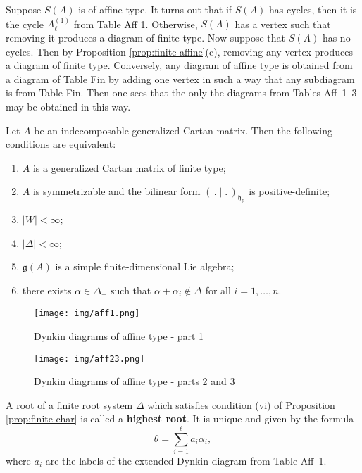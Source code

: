 \documentclass[12pt]{article}
\begin{document}
\begin{remark}
    Suppose $S(A)$ is of affine type. It turns out that if $S(A)$ has cycles, then it is the cycle $A_\ell^{(1)}$ from Table Aff 1. Otherwise, $S(A)$ has a vertex such that removing it produces a diagram of finite type. Now suppose that $S(A)$ has no cycles. Then by Proposition \ref{prop:finite-affine}(c), removing any vertex produces a diagram of finite type. Conversely, any diagram of affine type is obtained from a diagram of Table Fin by adding one vertex in such a way that any subdiagram is from Table Fin. Then one sees that the only the diagrams from Tables Aff~1--3 may be obtained in this way.
\end{remark}

\begin{proposition}\label{prop:finite-char}
Let $A$ be an indecomposable generalized Cartan matrix. Then the following 
conditions are equivalent:
\begin{enumerate}[label=(\roman*)]
    \item $A$ is a generalized Cartan matrix of finite type;
    \item $A$ is symmetrizable and the bilinear form $(\,.\mid.\,)_{\mathfrak{h}_\mathbb{R}}$ 
          is positive-definite;
    \item $|W| < \infty$;
    \item $|\Delta| < \infty$;
    \item $\mathfrak{g}(A)$ is a simple finite-dimensional Lie algebra;
    \item there exists $\alpha \in \Delta_+$ such that $\alpha+\alpha_i \notin \Delta$ 
          for all $i=1,\dots,n$.
\end{enumerate}
\end{proposition}

\begin{figure}[H]
    \centering
\texttt{[image: img/aff1.png]}
    \caption{Dynkin diagrams of affine type - part 1}
\end{figure}

\begin{figure}[H]
    \centering \texttt{[image: img/aff23.png]} 
    \caption{Dynkin diagrams of affine type - parts 2 and 3}
\end{figure}


\begin{remark}
A root of a finite root system $\Delta$ which satisfies condition (vi) of 
Proposition \ref{prop:finite-char} is called a \textbf{highest root}. It is unique and given by 
the formula
\[
   \theta = \sum_{i=1}^\ell a_i \alpha_i,
\]
where $a_i$ are the labels of the extended Dynkin diagram from Table Aff~1.
\end{remark}
\end{document}
